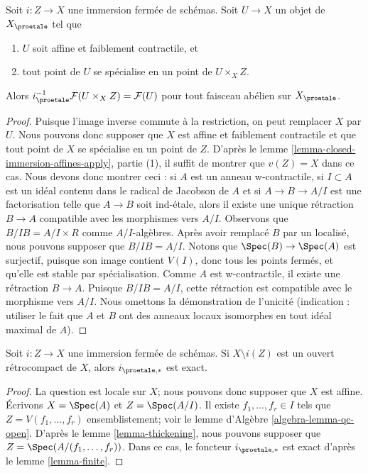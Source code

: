 \begin{lemma}
\label{lemma-compute-i-star}
Soit $i : Z \to X$ une immersion fermée de schémas.
Soit $U \to X$ un objet de $X_\proetale$ tel que
\begin{enumerate}
\item $U$ soit affine et faiblement contractile, et
\item tout point de $U$ se spécialise en un point de $U \times_X Z$.
\end{enumerate}
Alors $i_\proetale^{-1}\mathcal{F}(U \times_X Z) = \mathcal{F}(U)$
pour tout faisceau abélien sur $X_\proetale$.
\end{lemma}

\begin{proof}
Puisque l'image inverse commute à la restriction, on peut remplacer $X$ par $U$.
Nous pouvons donc supposer que $X$ est affine et faiblement contractile
et que tout point de $X$ se spécialise en un point de $Z$.
D'après le lemme \ref{lemma-closed-immersion-affines-apply}, partie (1),
il suffit de montrer que $v(Z) = X$ dans ce cas.
Nous devons donc montrer ceci : si $A$ est un anneau w-contractile, si $I \subset A$
est un idéal contenu dans le radical de Jacobson de $A$ et si $A \to B \to A/I$
est une factorisation telle que $A \to B$ soit ind-\'etale, alors il existe
une unique rétraction $B \to A$ compatible avec les morphismes vers $A/I$.
Observons que $B/IB = A/I \times R$ comme $A/I$-algèbres.
Après avoir remplacé $B$ par un localisé, nous pouvons supposer que $B/IB = A/I$.
Notons que $\Spec(B) \to \Spec(A)$ est surjectif, puisque son image
contient $V(I)$, donc tous les points fermés, et qu'elle est stable par
spécialisation. Comme $A$ est w-contractile, il existe une rétraction $B \to A$.
Puisque $B/IB = A/I$, cette rétraction est compatible avec le morphisme vers $A/I$.
Nous omettons la démonstration de l'unicité (indication : utiliser le fait que $A$ et $B$ ont
des anneaux locaux isomorphes en tout idéal maximal de $A$).
\end{proof}

\begin{lemma}
\label{lemma-closed-immersion-complement-retrocompact-exact}
Soit $i : Z \to X$ une immersion fermée de schémas.
Si $X \setminus i(Z)$ est un ouvert rétrocompact de $X$, alors
$i_{\proetale, *}$ est exact.
\end{lemma}

\begin{proof}
La question est locale sur $X$; nous pouvons donc supposer que $X$ est affine.
Écrivons $X = \Spec(A)$ et $Z = \Spec(A/I)$. Il existe
$f_1, \ldots, f_r \in I$ tels que $Z = V(f_1, \ldots, f_r)$
ensemblistement; voir le lemme d'Algèbre \ref{algebra-lemma-qc-open}.
D'après le lemme \ref{lemma-thickening}, nous pouvons supposer que
$Z = \Spec(A/(f_1, \ldots, f_r))$. Dans ce cas,
le foncteur $i_{\proetale, *}$ est exact d'après le
lemme \ref{lemma-finite}.
\end{proof}





